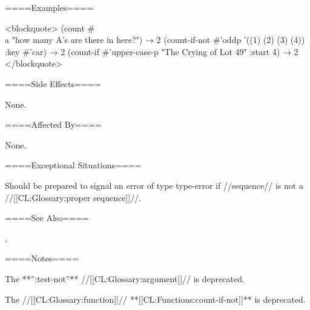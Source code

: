 ====Examples====

<blockquote> (count #\\a "how many A's are there in here?") → 2 (count-if-not #'oddp '((1) (2) (3) (4)) :key #'car) → 2 (count-if #'upper-case-p "The Crying of Lot 49" :start 4) → 2 </blockquote>

====Side Effects====

None.

====Affected By====

None.

====Exceptional Situations====

Should be prepared to signal an error of type type-error if //sequence// is not a //[[CL:Glossary:proper sequence]]//.

====See Also====

{\secref\TestFunctionRules},

{\secref\TraversalRules}

====Notes====

The **'':test-not''** //[[CL:Glossary:argument]]// is deprecated.

The //[[CL:Glossary:function]]// **[[CL:Functions:count-if-not]]** is deprecated.

    
